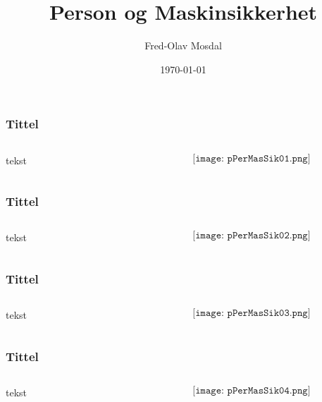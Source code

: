 \documentclass[aspectratio=169,xcolor=dvipsnames]{beamer}
\title[permas]{Person og Maskinsikkerhet} %
\author[Fred-Olav] {Fred-Olav Mosdal}
\institute[Gand VGS] %
{
    Gand VGS \\
    VG3 Automasjon }
\date{\today} %
\begin{document}
\begin{frame}
	\frametitle{Tittel}
	\begin{columns}
		\begin{column}{0.5\textwidth}
tekst
			
		\end{column}

		\begin{column}{0.5\textwidth}
	$$\texttt{[image: pPerMasSik01.png]}$$
		\end{column}
	\end{columns}
\end{frame}

\begin{frame}
	\frametitle{Tittel}
	\begin{columns}
		\begin{column}{0.5\textwidth}
tekst
			
		\end{column}

		\begin{column}{0.5\textwidth}
	$$\texttt{[image: pPerMasSik02.png]}$$
		\end{column}
	\end{columns}
\end{frame}

\begin{frame}
	\frametitle{Tittel}
	\begin{columns}
		\begin{column}{0.5\textwidth}
tekst
			
		\end{column}

		\begin{column}{0.5\textwidth}
	$$\texttt{[image: pPerMasSik03.png]}$$
		\end{column}
	\end{columns}
\end{frame}

\begin{frame}
	\frametitle{Tittel}
	\begin{columns}
		\begin{column}{0.5\textwidth}
tekst
			
		\end{column}

		\begin{column}{0.5\textwidth}
	$$\texttt{[image: pPerMasSik04.png]}$$
		\end{column}
	\end{columns}
\end{frame}
\end{document}
